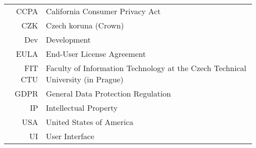 \documentclass[english,bachelor,oneside]{ctufit-thesis} %
\begin{document}
\chapter{\thectufitabbreviationlabel}
	
\begin{tabular}{rl}
CCPA    & California Consumer Privacy Act\\
CZK     & Czech koruna (Crown)\\
Dev     & Development\\
EULA    & End-User License Agreement\\
FIT CTU & Faculty of Information Technology at the Czech Technical University (in Prague)\\
GDPR    & General Data Protection Regulation\\
IP      & Intellectual Property\\
USA     & United States of America\\
UI      & User Interface\\
\end{tabular}
\resumeTOCentries
\mainmatter\mainmatterinit %


%
\clearpage %
\setcounter{page}{1}
%








%
\setcounter{page}{1} %

%
\appendix\appendixinit %
%

\backmatter %

\printbibliography %

\end{document}
